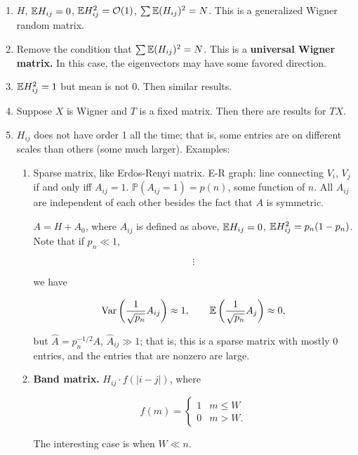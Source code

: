 \begin{enumerate}[(1)]

\item \(H\), \(\mathbb{E} H_{ij} = 0\), \(\mathbb{E} H_{ij}^2 = \mathcal{O}(1)\), \( \sum \mathbb{E}(H_{ij})^2 = N\).  This is a generalized Wigner random matrix. 

\item Remove the condition that \( \sum \mathbb{E}(H_{ij})^2 = N\). This is a \textbf{universal Wigner matrix.} In this case, the eigenvectors may have some favored direction.

\item \(\mathbb{E} H_{ij}^2 = 1\) but mean is not 0. Then similar results.

\item Suppose \(X\) is Wigner and \(T\) is a fixed matrix. Then there are results for \(TX\). 

\item \(H_{ij}\) does not have order 1 all the time; that is, some entries are on different scales than others (some much larger). Examples:

\begin{enumerate}

\item Sparse matrix, like Erdos-Renyi matrix. E-R graph: line connecting \(V_i\), \(V_j\) if and only iff \(A_{ij} = 1\). \(\mathbb{P}(A_{ij} = 1) = p(n)\), some function of \(n\). All \(A_{ij}\) are independent of each other besides the fact that \(A\) is symmetric. 

\(A = H + A_0\), where \(A_{ij}\) is defined as above, \(\mathbb{E} H_{ij} = 0\), \(\mathbb{E} H_{ij}^2 = p_n (1 - p_n)\). Note that if \(p_n \ll 1\),

\[
\vdots
\]

we have 

\[
\mathrm{Var} \left( \frac{1}{\sqrt{p_n}} A_{ij} \right) \approx 1, \qquad \mathbb{E} \left( \frac{1}{\sqrt{p_n}} A_j \right) \approx 0,
\]

but  \(\hat{A} = p_n^{-1/2} A\), \(\hat{A}_{ij} \gg 1\); that is, this is a sparse matrix with mostly 0 entries, and the entries that are nonzero are large.

\item \textbf{Band matrix.} \(H_{ij} \cdot f(|i-j|)\), where 

\[
f(m) = \begin{cases}
1 & m \leq W \\
0 & m > W.
\end{cases}
\]

The interesting case is when \(W \ll n\).

\end{enumerate}


\end{enumerate}




